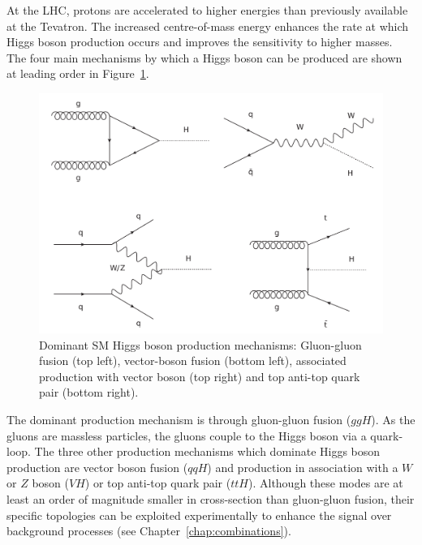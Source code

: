 At the LHC, protons are accelerated to higher energies than previously available at the 
Tevatron. The increased centre-of-mass energy enhances the 
rate at which Higgs boson production occurs and improves the sensitivity to higher 
masses. The four main mechanisms by which a Higgs boson can be produced
are shown at leading order in Figure~\ref{fig:higgsprodfeyn}.
\begin{figure}[hbtp!]
\begin{center}
\includegraphics[width=\textwidth]{theory/pheno/allprods_new.pdf}
\caption{Dominant SM Higgs boson production mechanisms: Gluon-gluon fusion (top left),
vector-boson fusion (bottom left), associated production with vector boson (top right) 
and top anti-top quark pair (bottom right).}
\label{fig:higgsprodfeyn}
\end{center}
\end{figure}
The dominant production mechanism is through gluon-gluon fusion ($ggH$). As the gluons
are massless particles, the gluons couple to the Higgs boson via a quark-loop.
The three other production mechanisms which dominate Higgs boson production are 
vector boson fusion ($qqH$) and production in association with 
a $W$ or $Z$ boson ($VH$) or top anti-top quark pair ($ttH$).
Although these modes are at least an order of magnitude smaller in cross-section
than gluon-gluon fusion, their specific topologies 
can be exploited experimentally to enhance the signal over background processes 
(see Chapter~\ref{chap:combinations}).

